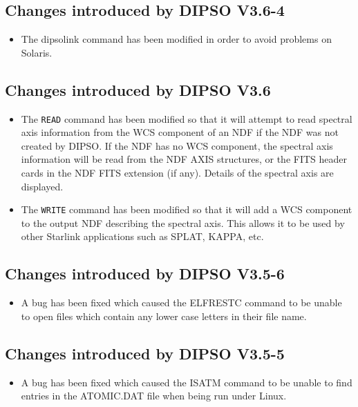\documentclass[twoside,11pt]{article}
\renewcommand{\_}{\texttt{\symbol{95}}}
\begin{document}
\subsection{Changes introduced by DIPSO V3.6-4}
\begin{itemize}
\item The dipso\_link command has been modified in order to avoid
problems on Solaris.
\end{itemize}

\subsection{Changes introduced by DIPSO V3.6}
\begin{itemize}
\item The {\tt READ} command has been modified so that it will attempt to
read spectral axis information from the WCS component of an NDF if the NDF
was not created by DIPSO. If the NDF has no WCS component, the spectral
axis information will be read from the NDF AXIS structures, or the FITS header 
cards in the NDF FITS extension (if any). Details of the spectral axis are 
displayed.
\item The {\tt WRITE} command has been modified so that it will add a WCS
component to the output NDF describing the spectral axis. This allows it
to be used by other Starlink applications such as SPLAT, KAPPA, etc.
\end{itemize}

\subsection{Changes introduced by DIPSO V3.5-6}
\begin{itemize}
\item A bug has been fixed which caused the ELFRESTC command to be unable to
open files which contain any lower case letters in their file name.
\end{itemize}

\subsection{Changes introduced by DIPSO V3.5-5}
\begin{itemize}
\item A bug has been fixed which caused the ISATM command to be unable to
find entries in the ATOMIC.DAT file when being run under Linux.
\end{itemize}
\end{document}
